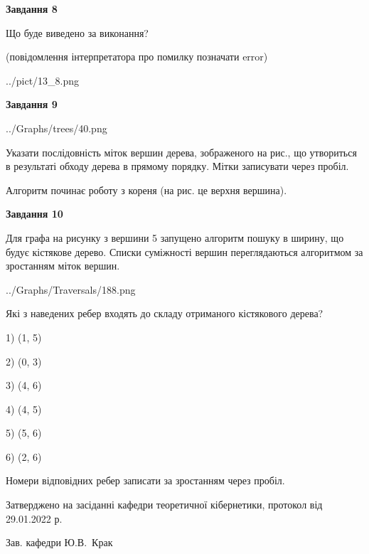 \documentclass[12pt, ukrainian]{article}
\begin{document}
{\begin {large}
{\begin {center}\textbf{Завдання 8}\end {center}}\par
Що буде виведено за виконання?\par
 (повідомлення інтерпретатора про помилку позначати error)\par
\begin{center}
	{../pict/13_8.png}
\end{center}
\newpage

{\begin {center}\textbf{Завдання 9}\end {center}}\par

\begin{center}
	{../Graphs/trees/40.png}
\end{center}
Указати послідовність міток вершин дерева, зображеного на рис., що утвориться в результаті обходу дерева в прямому порядку. Мітки записувати через пробіл.\par Алгоритм починає роботу з кореня (на рис. це верхня вершина).\par
\newpage

{\begin {center}\textbf{Завдання 10}\end {center}}\par
Для графа на рисунку з вершини 5 запущено алгоритм пошуку в ширину, що будує кістякове дерево. Списки суміжності вершин переглядаються алгоритмом за зростанням міток вершин.\par
\begin{center}
	{../Graphs/Traversals/188.png}
\end{center}
\par Які з наведених ребер входять до складу отриманого кістякового дерева?\par
1) (1, 5)\par
2) (0, 3)\par
3) (4, 6)\par
4) (4, 5)\par
5) (5, 6)\par
6) (2, 6)\par
{\vskip 15pt} Номери відповідних ребер записати за зростанням через пробіл.\par
\newpage


\end {large}
}
{\smallskip \begin {small} Затверджено на засіданні кафедри теоретичної кібернетики, протокол  від   29.01.2022 р.\par\smallskip\smallskip
{\parbox {6.5 cm}{Зав. кафедри \dotfill Ю.В.~Крак}} \end{small}}
\end{document}
